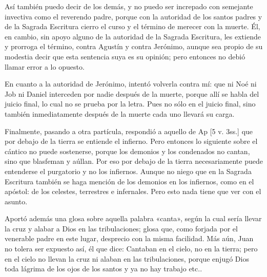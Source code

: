 Así también puedo decir de los demás, y no puedo ser increpado con semejante invectiva como el reverendo padre, porque con la autoridad de los santos padres y de la Sagrada Escritura cierro el curso y el término de merecer con la muerte. Él, en cambio, sin apoyo alguno de la autoridad de la Sagrada Escritura, les extiende y prorroga el término, contra Agustín y contra Jerónimo, aunque sea propio de su modestia decir que esta sentencia suya es su opinión; pero entonces no debió llamar error a lo opuesto.

En cuanto a la autoridad de Jerónimo, intentó volverla contra mí: que ni Noé ni Job ni Daniel interceden por nadie después de la muerte, porque allí se habla del juicio final, lo cual no se prueba por la letra. Pues no sólo en el juicio final, sino también inmediatamente después de la muerte cada uno llevará su carga.

Finalmente, pasando a otra partícula, respondió a aquello de Ap [5 v. 3ss.] que por debajo de la tierra se entiende el infierno. Pero entonces lo siguiente sobre el cántico no puede sostenerse, porque los demonios y los condenados no cantan, sino que blasfeman y aúllan. Por eso por debajo de la tierra necesariamente puede entenderse el purgatorio y no los infiernos. Aunque no niego que en la Sagrada Escritura también se haga mención de los demonios en los infiernos, como en el apóstol: de los celestes, terrestres e infernales. Pero esto nada tiene que ver con el asunto.

Aportó además una glosa sobre aquella palabra «canta», según la cual sería llevar la cruz y alabar a Dios en las tribulaciones; glosa que, como forjada por el venerable padre en este lugar, desprecio con la misma facilidad. Más aún, Juan no tolera ser expuesto así, él que dice: Cantaban en el cielo, no en la tierra; pero en el cielo no llevan la cruz ni alaban en las tribulaciones, porque enjugó Dios toda lágrima de los ojos de los santos y ya no hay trabajo etc..

